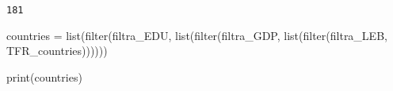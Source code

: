 \documentclass[
  letterpaper,
  DIV=11,
  numbers=noendperiod]{scrreprt}
\newenvironment{Shaded}{\begin{snugshade}}{\end{snugshade}}
\newcommand{\BuiltInTok}[1]{\textcolor[rgb]{0.00,0.23,0.31}{#1}}
\newcommand{\NormalTok}[1]{\textcolor[rgb]{0.00,0.23,0.31}{#1}}
\newcommand{\OperatorTok}[1]{\textcolor[rgb]{0.37,0.37,0.37}{#1}}
\begin{document}
\begin{verbatim}
181
\end{verbatim}

\begin{Shaded}
\begin{Highlighting}[]
\NormalTok{countries }\OperatorTok{=} \BuiltInTok{list}\NormalTok{(}\BuiltInTok{filter}\NormalTok{(filtra\_EDU, }\BuiltInTok{list}\NormalTok{(}\BuiltInTok{filter}\NormalTok{(filtra\_GDP, }\BuiltInTok{list}\NormalTok{(}\BuiltInTok{filter}\NormalTok{(filtra\_LEB, TFR\_countries))))))}
\end{Highlighting}
\end{Shaded}

\begin{Shaded}
\begin{Highlighting}[]
\BuiltInTok{print}\NormalTok{(countries)}
\end{Highlighting}
\end{Shaded}
\end{document}
